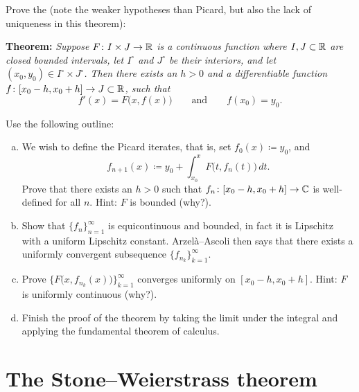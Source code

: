 \begin{exercise} \label{exercise:peanoexistence}
Prove the \emph{} (note the weaker
hypotheses than Picard, but also the lack of
uniqueness in this theorem):

\textbf{Theorem:} \emph{Suppose $F \colon I \times J \to {\mathbb{R}}$ is 
a continuous function where
$I, J \subset {\mathbb{R}}$ are closed bounded intervals, 
let $I^\circ$ and $J^\circ$ be their interiors,
and
let $(x_0,y_0) \in I^\circ \times J^\circ$.
Then there exists an $h > 0$ and a differentiable
function $f \colon [x_0 - h, x_0 + h] \to J \subset {\mathbb{R}}$, such that}
\begin{equation*}
f'(x) = F\bigl(x,f(x)\bigr) \qquad \text{and} \qquad f(x_0) = y_0.
\end{equation*}

Use the following outline:
\begin{enumerate}[a)]
\item
We wish to define the Picard iterates, that is,
set $f_0(x) \coloneqq y_0$, and 
\begin{equation*}
f_{n+1}(x) \coloneqq y_0 + \int_{x_0}^x F\bigl(t,f_n(t)\bigr)\,dt .
\end{equation*}
Prove that there exists an $h > 0$ such that
$f_n \colon [x_0 - h, x_0 + h] \to {\mathbb{C}}$ is well-defined
for all $n$.  Hint: $F$ is bounded (why?).
\item
Show that $\{ f_n \}_{n=1}^\infty$ is equicontinuous and bounded, in fact it is
Lipschitz with a uniform Lipschitz constant.  Arzel\`a--Ascoli
then says that there exists a
uniformly convergent subsequence $\{ f_{n_k} \}_{k=1}^\infty$.
\item
Prove 
$\bigl\{ F\bigl(x,f_{n_k}(x)\bigr) \bigr\}_{k=1}^\infty$ converges uniformly
on $[x_0-h,x_0+h]$.
Hint: $F$ is uniformly continuous (why?).
\item
Finish the proof of the theorem by taking the limit under the integral
and applying the fundamental theorem of calculus.
\end{enumerate}
\end{exercise}


\sectionnewpage
\section{The Stone--Weierstrass theorem}
\label{sec:stoneweier}



